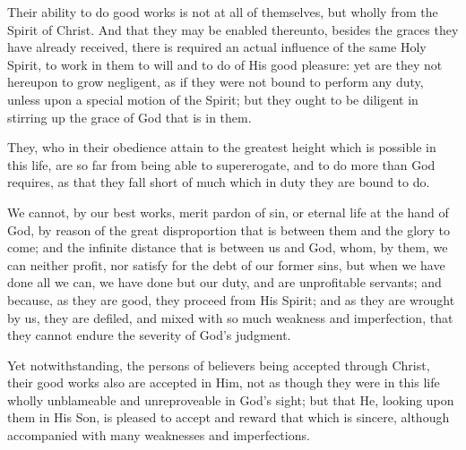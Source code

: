 \begin{outerlst}[left=0pt,labelsep=0pt]
\begin{innerlst}[resume*]
\item Their ability to do good works is not at all of themselves, but wholly from the Spirit of Christ. And that they may be enabled thereunto, besides the graces they have already received, there is required an actual influence of the same Holy Spirit, to work in them to will and to do of His good pleasure: yet are they not hereupon to grow negligent, as if they were not bound to perform any duty, unless upon a special motion of the Spirit; but they ought to be diligent in stirring up the grace of God that is in them.   

\item They, who in their obedience attain to the greatest height which is possible in this life, are so far from being able to supererogate, and to do more than God requires, as that they fall short of much which in duty they are bound to do.   

\item We cannot, by our best works, merit pardon of sin, or eternal life at the hand of God, by reason of the great disproportion that is between them and the glory to come; and the infinite distance that is between us and God, whom, by them, we can neither profit, nor satisfy for the debt of our former sins, but when we have done all we can, we have done but our duty, and are unprofitable servants; and because, as they are good, they proceed from His Spirit; and as they are wrought by us, they are defiled, and mixed with so much weakness and imperfection, that they cannot endure the severity of God's judgment.    

\item Yet notwithstanding, the persons of believers being accepted through Christ, their good works also are accepted in Him, not as though they were in this life wholly unblameable and unreproveable in God's sight; but that He, looking upon them in His Son, is pleased to accept and reward that which is sincere, although accompanied with many weaknesses and imperfections.   


\end{innerlst}
\end{outerlst}
